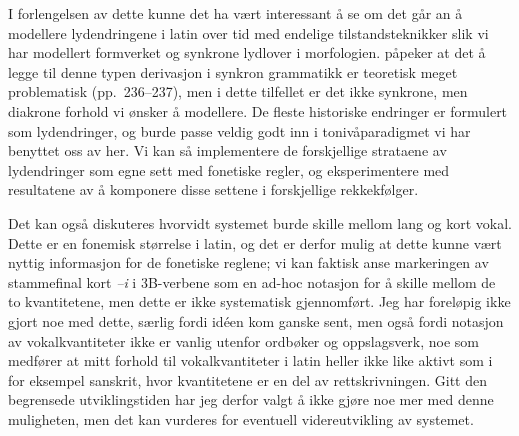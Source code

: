 \documentclass{article}
\let\w\emph
\begin{document}
I forlengelsen av dette kunne det ha v\ae{}rt interessant \aa{} se om det
g\aa{}r an \aa{} modellere lydendringene i latin over tid med endelige
tilstandsteknikker slik vi har modellert formverket og synkrone lydlover i
morfologien.  p\aa{}peker at det \aa{} legge til denne typen
derivasjon i synkron grammatikk er teoretisk meget problematisk
(pp.~236--237), men i dette tilfellet er det ikke synkrone, men diakrone
forhold vi \o{}nsker \aa{} modellere. De fleste historiske endringer er
formulert som lydendringer, og burde passe veldig godt inn i
toniv\aa{}paradigmet vi har benyttet oss av her. Vi kan s\aa{} implementere de
forskjellige strataene av lydendringer som egne sett med fonetiske regler, og
eksperimentere med resultatene av \aa{} komponere disse settene i forskjellige
rekkekf\o{}lger.

Det kan ogs\aa{} diskuteres hvorvidt systemet burde skille mellom lang og kort
vokal. Dette er en fonemisk st\o{}rrelse i latin, og det er derfor mulig at
dette kunne v\ae{}rt nyttig informasjon for de fonetiske reglene; vi kan
faktisk anse markeringen av stammefinal kort \w{--i} i 3B-verbene som en
ad-hoc notasjon for \aa{} skille mellom de to kvantitetene, men dette er ikke
systematisk gjennomf\o{}rt. Jeg har forel\o{}pig ikke gjort noe med dette,
s\ae{}rlig fordi id\'een kom ganske sent, men ogs\aa{} fordi notasjon av
vokalkvantiteter ikke er vanlig utenfor ordb\o{}ker og oppslagsverk, noe som
medf\o{}rer at mitt forhold til vokalkvantiteter i latin heller ikke like
aktivt som i for eksempel sanskrit, hvor kvantitetene er en del av
rettskrivningen. Gitt den begrensede utviklingstiden har jeg derfor valgt
\aa{} ikke gj\o{}re noe mer med denne muligheten, men det kan vurderes for
eventuell videreutvikling av systemet.

\clearpage

{}

\tableofcontents
\listoftables

\clearpage
\appendix
\end{document}
